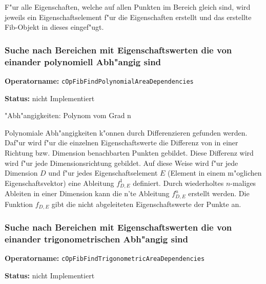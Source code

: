 F"ur alle Eigenschaften, welche auf allen Punkten im Bereich gleich sind, wird jeweils ein Eigenschaftselement f"ur die Eigenschaften erstellt und das erstellte Fib-Objekt in dieses eingef"ugt.



\subsubsection{Suche nach Bereichen mit Eigenschaftswerten die von einander polynomiell Abh"angig sind}


\textbf{Operatorname:} \verb|cOpFibFindPolynomialAreaDependencies|

\bigskip\noindent
\textbf{Status:} nicht Implementiert

\bigskip\noindent
"Abh"angigkeiten: Polynom vom Grad n

Polynomiale Abh"angigkeiten k"onnen durch Differenzieren gefunden werden. Daf"ur wird f"ur die einzelnen Eigenschaftswerte die Differenz von in einer Richtung bzw. Dimension benachbarten Punkten gebildet. Diese Differenz wird wird f"ur jede Dimensionsrichtung gebildet. Auf diese Weise wird f"ur jede Dimension $D$ und f"ur jedes Eigenschaftselement $E$ (Element in einem m"oglichen Eigenschaftsvektor) eine Ableitung $f_{D,E}^1$ definiert. Durch wiederholtes $n$-maliges Ableiten in einer Dimension kann die n'te Ableitung $f_{D,E}^n$ erstellt werden. Die Funktion $f_{D,E}$ gibt die nicht abgeleiteten Eigenschaftswerte der Punkte an.






\subsubsection{Suche nach Bereichen mit Eigenschaftswerten die von einander trigonometrischen Abh"angig sind}


\textbf{Operatorname:} \verb|cOpFibFindTrigonometricAreaDependencies|

\bigskip\noindent
\textbf{Status:} nicht Implementiert

